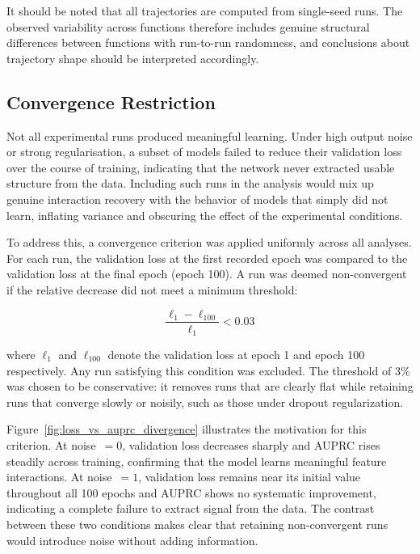 \documentclass{article}
\begin{document}
It should be noted that all trajectories are computed from single-seed runs. 
The observed variability across functions therefore includes genuine 
structural differences between functions with run-to-run randomness, and 
conclusions about trajectory shape should be interpreted accordingly.

\FloatBarrier
\subsection{Convergence Restriction}

Not all experimental runs produced meaningful learning. Under high output noise or strong
regularisation, a subset of models failed to reduce their validation loss over the course
of training, indicating that the network never extracted usable structure from the data.
Including such runs in the analysis would mix up genuine interaction recovery with the
behavior of models that simply did not learn, inflating variance and obscuring the effect of the experimental conditions.

To address this, a convergence criterion was applied uniformly across all analyses. For
each run, the validation loss at the first recorded epoch was compared to the validation
loss at the final epoch (epoch 100). A run was deemed non-convergent if the relative decrease did not meet a minimum threshold:

\begin{equation}
    \frac{\ell_1 - \ell_{100}}{\ell_1} < 0.03
    \label{eq:convergence_criterion}
\end{equation}

\noindent where $\ell_1$ and $\ell_{100}$ denote the validation loss at epoch 1 and
epoch 100 respectively. Any run satisfying this condition
was excluded. The threshold of 3\% was chosen to be conservative: it removes runs that are clearly flat while retaining runs that converge slowly or noisily, such as those under dropout regularization.

Figure~\ref{fig:loss_vs_auprc_divergence} illustrates the motivation for this criterion.
At noise~$= 0$, validation loss decreases sharply and AUPRC rises steadily across
training, confirming that the model learns meaningful feature interactions. At
noise~$= 1$, validation loss remains near its initial value throughout all 100 epochs and AUPRC shows no systematic improvement, indicating a complete failure to extract
signal from the data. The contrast between these two conditions makes clear that retaining non-convergent runs would introduce noise without adding information.
\end{document}
